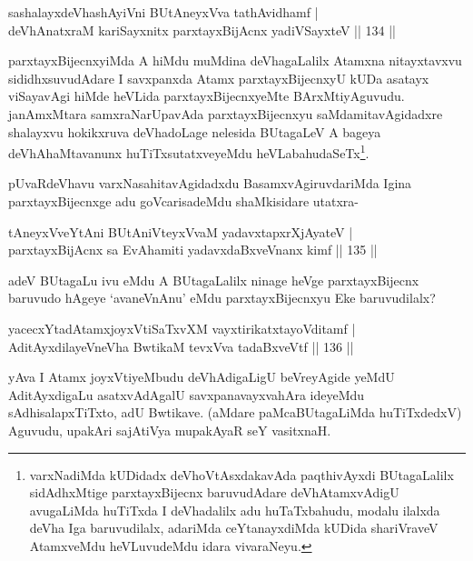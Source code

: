 \begin{shl}
sashalayxdeVhashAyiVni BUtAneyxVva tathAvidhamf | \\
deVhAnatxraM kariSayxnitx parxtayxBijAcnx yadiVSayxteV \hfill||  134 ||  
\end{shl}

\begin{artha}
parxtayxBijecnxyiMda A hiMdu muMdina deVhagaLalilx Atamxna nitayxtavxvu sididhxsuvudAdare I savxpanxda Atamx parxtayxBijecnxyU kUDa asatayx viSayavAgi hiMde heVLida parxtayxBijecnxyeMte BArxMtiyAguvudu. janAmxMtara samxraNarUpavAda parxtayxBijecnxyu saMdamitavAgidadxre shalayxvu hokikxruva deVhadoLage nelesida BUtagaLeV A bageya deVhAhaMtavanunx huTiTxsutatxveyeMdu heVLabahudaSeTx\footnote{varxNadiMda kUDidadx deVhoVtAsxdakavAda paqthivAyxdi BUtagaLalilx sidAdhxMtige parxtayxBijecnx baruvudAdare deVhAtamxvAdigU avugaLiMda huTiTxda I deVhadalilx adu huTaTxbahudu, modalu ilalxda deVha Iga baruvudilalx, adariMda ceYtanayxdiMda kUDida shariVraveV AtamxveMdu heVLuvudeMdu idara vivaraNeyu.}.
\end{artha}

\begin{artha}
pUvaRdeVhavu varxNasahitavAgidadxdu BasamxvAgiruvdariMda Igina parxtayxBijecnxge adu goVcarisadeMdu shaMkisidare utatxra-
\end{artha}

\begin{shl}
tAneyxVveYtAni BUtAniVteyxVvaM yadavxtapxrXjAyateV  | \\
parxtayxBijAcnx sa EvAhamiti yadavxdaBxveVnanx kimf \hfill||  135 ||  
\end{shl}

\begin{artha}
adeV BUtagaLu ivu eMdu A BUtagaLalilx ninage heVge parxtayxBijecnx baruvudo hAgeye `avaneVnAnu' eMdu parxtayxBijecnxyu Eke baruvudilalx?
\end{artha}

\begin{shl}
yacecxYtadAtamxjoyxVtiSaTxvXM vayxtirikatxtayoVditamf | \\
AditAyxdilayeVneVha BwtikaM tevxVva tadaBxveVtf \hfill||  136 ||  
\end{shl}

\begin{artha}
yAva I Atamx joyxVtiyeMbudu deVhAdigaLigU beVreyAgide yeMdU AditAyxdigaLu asatxvAdAgalU savxpanavayxvahAra ideyeMdu sAdhisalapxTiTxto, adU Bwtikave. (aMdare paMcaBUtagaLiMda huTiTxdedxV) Aguvudu, upakAri sajAtiVya mupakAyaR seY vasitxnaH.
\end{artha}

